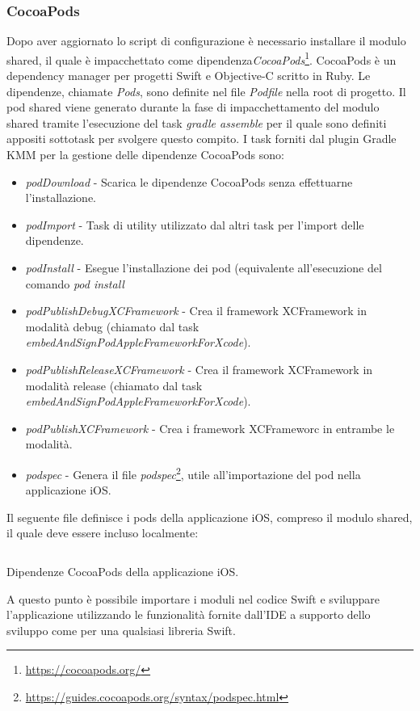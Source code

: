 \subsubsection{CocoaPods}
Dopo aver aggiornato lo script di configurazione è necessario installare il modulo shared, il quale è impacchettato come dipendenza\textit{CocoaPods}\footnote{\url{https://cocoapods.org/}}. CocoaPods è un dependency manager per progetti Swift e Objective-C scritto in Ruby. Le dipendenze, chiamate \textit{Pods}, sono definite nel file \textit{Podfile} nella root di progetto. Il pod shared viene generato durante la fase di impacchettamento del modulo shared tramite l'esecuzione del task \textit{gradle assemble} per il quale sono definiti appositi sottotask per svolgere questo compito. I task forniti dal plugin Gradle KMM per la gestione delle dipendenze CocoaPods sono:
\begin{itemize}
    \item \textit{podDownload} - Scarica le dipendenze CocoaPods senza effettuarne l'installazione.
    \item \textit{podImport} - Task di utility utilizzato dal altri task per l'import delle dipendenze.
    \item \textit{podInstall} - Esegue l'installazione dei pod (equivalente all'esecuzione del comando \textit{pod install}
    \item \textit{podPublishDebugXCFramework} - Crea il framework XCFramework in modalità debug (chiamato dal task \textit{embedAndSignPodAppleFrameworkForXcode}).
    \item \textit{podPublishReleaseXCFramework} - Crea il framework XCFramework in modalità release (chiamato dal task \textit{embedAndSignPodAppleFrameworkForXcode}).
    \item \textit{podPublishXCFramework} - Crea i framework XCFrameworc in entrambe le modalità.
    \item \textit{podspec} - Genera il file \textit{podspec}\footnote{\url{https://guides.cocoapods.org/syntax/podspec.html}}, utile all'importazione del pod nella applicazione iOS.
\end{itemize}

Il seguente file definisce i pods della applicazione iOS, compreso il modulo shared, il quale deve essere incluso localmente:

\begin{listing}[H]
\inputminted{bash}{code/5-podfile}
\caption{Dipendenze CocoaPods della applicazione iOS.}
\end{listing}
A questo punto è possibile importare i moduli nel codice Swift e sviluppare l'applicazione utilizzando le funzionalità fornite dall'IDE a supporto dello sviluppo come per una qualsiasi libreria Swift.